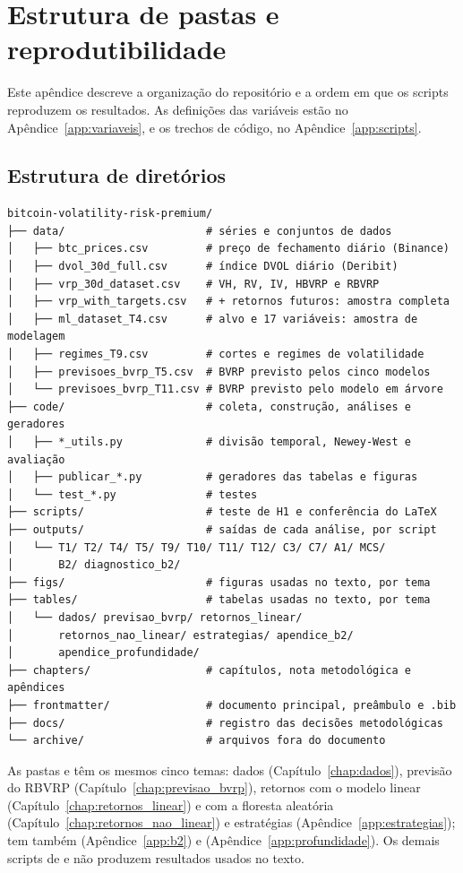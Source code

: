 \chapter{Estrutura de pastas e reprodutibilidade}
\label{app:pastas}

Este apêndice descreve a organização do repositório e a ordem
em que os scripts reproduzem os resultados. As definições das variáveis estão
no Apêndice~\ref{app:variaveis}, e os trechos de código, no
Apêndice~\ref{app:scripts}.

\section{Estrutura de diretórios}

\begin{verbatim}
bitcoin-volatility-risk-premium/
├── data/                      # séries e conjuntos de dados
│   ├── btc_prices.csv         # preço de fechamento diário (Binance)
│   ├── dvol_30d_full.csv      # índice DVOL diário (Deribit)
│   ├── vrp_30d_dataset.csv    # VH, RV, IV, HBVRP e RBVRP
│   ├── vrp_with_targets.csv   # + retornos futuros: amostra completa
│   ├── ml_dataset_T4.csv      # alvo e 17 variáveis: amostra de modelagem
│   ├── regimes_T9.csv         # cortes e regimes de volatilidade
│   ├── previsoes_bvrp_T5.csv  # BVRP previsto pelos cinco modelos
│   └── previsoes_bvrp_T11.csv # BVRP previsto pelo modelo em árvore
├── code/                      # coleta, construção, análises e geradores
│   ├── *_utils.py             # divisão temporal, Newey-West e avaliação
│   ├── publicar_*.py          # geradores das tabelas e figuras
│   └── test_*.py              # testes
├── scripts/                   # teste de H1 e conferência do LaTeX
├── outputs/                   # saídas de cada análise, por script
│   └── T1/ T2/ T4/ T5/ T9/ T10/ T11/ T12/ C3/ C7/ A1/ MCS/
│       B2/ diagnostico_b2/
├── figs/                      # figuras usadas no texto, por tema
├── tables/                    # tabelas usadas no texto, por tema
│   └── dados/ previsao_bvrp/ retornos_linear/
│       retornos_nao_linear/ estrategias/ apendice_b2/
│       apendice_profundidade/
├── chapters/                  # capítulos, nota metodológica e apêndices
├── frontmatter/               # documento principal, preâmbulo e .bib
├── docs/                      # registro das decisões metodológicas
└── archive/                   # arquivos fora do documento
\end{verbatim}

As pastas  e  têm os mesmos cinco temas: dados
(Capítulo~\ref{chap:dados}), previsão do RBVRP
(Capítulo~\ref{chap:previsao_bvrp}), retornos com o modelo linear
(Capítulo~\ref{chap:retornos_linear}) e com a floresta aleatória
(Capítulo~\ref{chap:retornos_nao_linear}) e estratégias
(Apêndice~\ref{app:estrategias});  tem também
 (Apêndice~\ref{app:b2}) e 
(Apêndice~\ref{app:profundidade}). Os demais scripts de  e
 não produzem resultados usados no texto.

